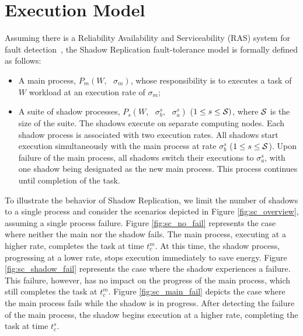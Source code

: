 \section{Execution Model}
Assuming there is a Reliability Availability and Serviceability (RAS) system for fault detection~\cite{ferreira_sc_2011}, 
the Shadow Replication fault-tolerance model is formally defined as follows:
\begin{itemize}
	\item A main process, $P_m(W,\text{ }\sigma_m)$, whose responsibility is to executes a task of $W$ workload at an execution rate of $\sigma_m$;
	\item A suite of shadow processes, $P_{s}(W,\text{ }\sigma_b^s, \text{ }\sigma_a^s)$ ($1 \le s \le \cal S)$, where $\cal S$ is the size of the suite. The shadows execute on separate computing nodes. Each shadow process is associated with two execution rates. All shadows start execution simultaneously with the main process at rate $\sigma_b^s$ ($1 \le s \le \cal S$). Upon failure of the main process, all shadows switch their executions to $\sigma_a^s$, with one shadow being designated as the new main process. This process continues until completion of the task.
\end{itemize}

To illustrate the behavior of Shadow Replication, we limit the number of shadows to a single process and consider the scenarios depicted in Figure \ref{fig:sc_overview}, assuming a single process failure. 
Figure \ref{fig:sc_no_fail} represents the case where neither the main nor the shadow fails. The main process, executing
at a higher rate, completes the task at time $t_c^m$. At this time, the shadow process, progressing at a lower rate, stops execution immediately to save energy. Figure \ref{fig:sc_shadow_fail} represents the case where the shadow experiences a failure. This failure, however, has no impact on the progress of the main process, which still completes the task at $t_c^m$. Figure \ref{fig:sc_main_fail} depicts the case where the main process fails while the shadow is in progress. After detecting the failure of the main process, the shadow begins execution at a higher rate, completing the task at time $t_c^s$. 


